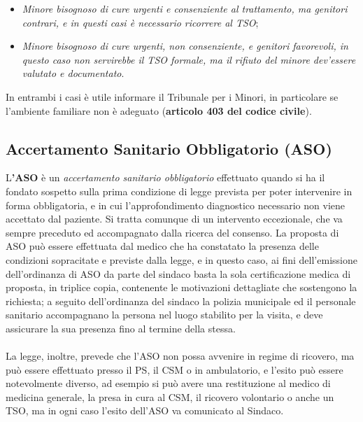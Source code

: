 \begin{itemize}
\item
  \emph{Minore bisognoso di cure urgenti e consenziente al trattamento,
  ma genitori contrari, e in questi casi è necessario ricorrere al TSO};
\item
  \emph{Minore bisognoso di cure urgenti, non consenziente, e genitori
  favorevoli, in questo caso non servirebbe il TSO formale, ma il
  rifiuto del minore dev'essere valutato e documentato}.
\end{itemize}

In entrambi i casi è utile informare il Tribunale per i Minori, in
particolare se l'ambiente familiare non è adeguato (\textbf{articolo 403
del codice civile}).

\subsection{Accertamento Sanitario Obbligatorio (ASO)}

L\textbf{'ASO} è un \emph{accertamento sanitario obbligatorio}
effettuato quando si ha il fondato sospetto sulla prima condizione di
legge prevista per poter intervenire in forma obbligatoria, e in cui
l'approfondimento diagnostico necessario non viene accettato dal
paziente. Si tratta comunque di un intervento eccezionale, che va sempre
preceduto ed accompagnato dalla ricerca del consenso. La proposta di ASO
può essere effettuata dal medico che ha constatato la presenza delle
condizioni sopracitate e previste dalla legge, e in questo caso, ai fini
dell'emissione dell'ordinanza di ASO da parte del sindaco basta la sola
certificazione medica di proposta, in triplice copia, contenente le
motivazioni dettagliate che sostengono la richiesta; a seguito
dell'ordinanza del sindaco la polizia municipale ed il personale
sanitario accompagnano la persona nel luogo stabilito per la visita, e
deve assicurare la sua presenza fino al termine della stessa.
\\\\
La legge, inoltre, prevede che l'ASO non possa avvenire in regime di
ricovero, ma può essere effettuato presso il PS, il CSM o in
ambulatorio, e l'esito può essere notevolmente diverso, ad esempio si
può avere una restituzione al medico di medicina generale, la presa in
cura al CSM, il ricovero volontario o anche un TSO, ma in ogni caso
l'esito dell'ASO va comunicato al Sindaco.
